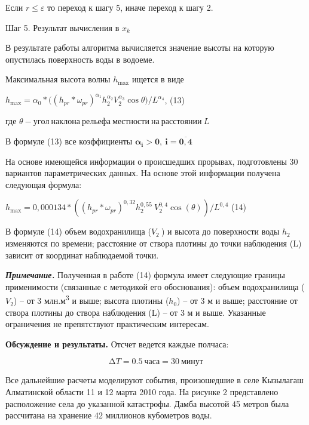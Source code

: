 \begin{multicols}{2}
Если \(r \leq \varepsilon\) то переход к шагу 5, иначе переход к шагу 2.

Шаг 5. Результат вычисления в \(x_{k}\)

В результате работы алгоритма вычисляется значение высоты на которую
опустилась поверхность воды в водоеме.

Максимальная высота волны \(h_{\max}\) ищется в виде

\(h_{\max} = \alpha_{0}*(\left( h_{pr}*\omega_{pr} \right)^{\alpha_{1}}h_{2}^{\alpha_{2}}V_{2}^{\alpha_{3}}\cos{\theta)/L^{\alpha_{4}}}\),
(13)

где \(\theta - угол\ наклона\ рельефа\ местности\ на\ расстоянии\ L\)

В формуле (13) все коэффициенты
\(\mathbf{\alpha}_{\mathbf{i}}\mathbf{>}\mathbf{0,\ }\mathbf{i}\mathbf{=}\overline{\mathbf{0,4}}\)

На основе имеющейся информации о происшедших прорывах, подготовлены 30
вариантов параметрических данных. На основе этой информации получена
следующая формула:

\(h_{\max} = 0,000134*(\left( h_{pr}*\omega_{pr} \right)^{0,32}h_{2}^{0,55}\ V_{2}^{0,4}\cos(\theta))/L^{0,4}\)
(14)

В формуле (14) объем водохранилища (\(V_{2}\ \)) и высота до поверхности
воды \(h_{2}\) изменяются по времени; расстояние от створа плотины до
точки наблюдения (L) зависит от координат наблюдаемой точки.

\emph{{\bfseries Примечание.}} Полученная в работе (14) формула имеет
следующие границы применимости (связанные с методикой его обоснования):
объем водохранилища (\(V_{2}\)) -- от 3 млн.м\textsuperscript{3} и выше;
высота плотины (\(h_{0}\)) -- от 3 м и выше; расстояние от створа
плотины до створа наблюдения (L) -- от 3 м и выше. Указанные ограничения
не препятствуют практическим интересам.

{\bfseries Обсуждение и результаты.} Отсчет ведется каждые полчаса:

\[\mathrm{\Delta}T = 0.5\ часа = 30\ минут\]

Все дальнейшие расчеты моделируют события, произошедшие в селе Кызылагаш
Алматинской области 11 и 12 марта 2010 года. На рисунке 2 представлено
расположение села до указанной катастрофы. Дамба высотой 45 метров была
рассчитана на хранение 42 миллионов кубометров воды.
\end{multicols}


